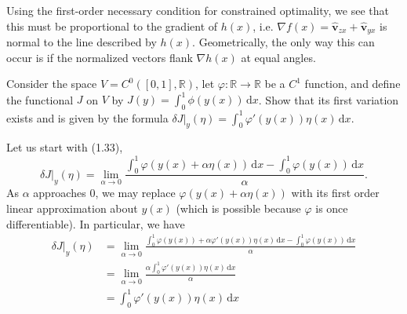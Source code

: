\documentclass[../calculus-of-variations-and-optimal-control-theory.tex]{subfiles}
\begin{document}
\begin{questions}
\begin{solution}
	Using the first-order necessary condition for constrained optimality, we see that this must be proportional to the gradient of $h(x)$, i.e. $\nabla f(x) = \hat{\mathbf{v}}_{zx} + \hat{\mathbf{v}}_{yx}$ is normal to the line described by $h(x)$. Geometrically, the only way this can occur is if the normalized vectors flank $\nabla h(x)$ at equal angles.
\end{solution}

\question Consider the space $V = C^0([0, 1], \mathbb{R})$, let $\varphi : \mathbb{R} \to \mathbb{R}$ be a $C^1$ function, and define the functional $J$ on $V$ by $J(y) = \int_0^1\phi(y(x))\,\mathrm{d}x$. Show that its first variation exists and is given by the formula $\delta J|_y(\eta) = \int_0^1\varphi'(y(x))\eta(x)\,\mathrm{d}x$.

\begin{solution}
	Let us start with (1.33),
	\[
		\delta J|_y (\eta) = \lim_{\alpha \to 0}\frac{\int_0^1\varphi(y(x) + \alpha\eta(x))\,\mathrm{d}x - \int_0^1\varphi(y(x))\,\mathrm{d}x}{\alpha}.
	\]
	As $\alpha$ approaches $0$, we may replace $\varphi(y(x) + \alpha\eta(x))$ with its first order linear approximation about $y(x)$ (which is possible because $\varphi$ is once differentiable). In particular, we have
	\begin{align*}
		\delta J|_y (\eta) &= \lim_{\alpha \to 0}\frac{\int_0^1\varphi(y(x)) + \alpha\varphi'(y(x))\eta(x)\,\mathrm{d}x - \int_0^1\varphi(y(x))\,\mathrm{d}x}{\alpha} \\
		&= \lim_{\alpha \to 0}\frac{\alpha\int_0^1\varphi'(y(x))\eta(x)\,\mathrm{d}x}{\alpha} \\
		&= \int_0^1\varphi'(y(x))\eta(x)\,\mathrm{d}x
	\end{align*}
\end{solution}

\end{questions}
\end{document}
